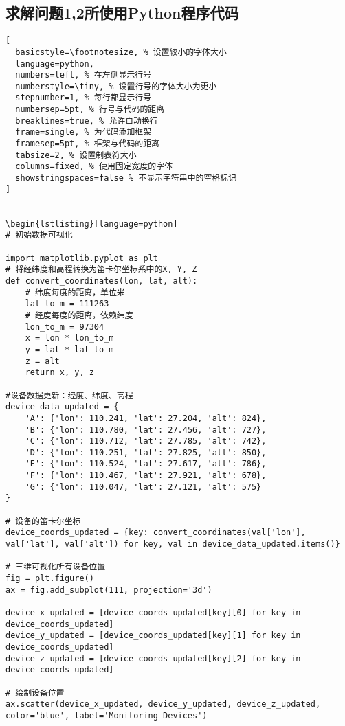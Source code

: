 \documentclass[withoutpreface,bwprint,12pt,a4paper]{cumcmthesis}
\begin{document}
\begin{appendices}

\newpage


\section{求解问题1,2所使用Python程序代码}

\begin{lstlisting}[
  basicstyle=\footnotesize, % 设置较小的字体大小
  language=python,
  numbers=left, % 在左侧显示行号
  numberstyle=\tiny, % 设置行号的字体大小为更小
  stepnumber=1, % 每行都显示行号
  numbersep=5pt, % 行号与代码的距离
  breaklines=true, % 允许自动换行
  frame=single, % 为代码添加框架
  framesep=5pt, % 框架与代码的距离
  tabsize=2, % 设置制表符大小
  columns=fixed, % 使用固定宽度的字体
  showstringspaces=false % 不显示字符串中的空格标记
]


\begin{lstlisting}[language=python]
# 初始数据可视化

import matplotlib.pyplot as plt
# 将经纬度和高程转换为笛卡尔坐标系中的X, Y, Z
def convert_coordinates(lon, lat, alt):
    # 纬度每度的距离，单位米
    lat_to_m = 111263
    # 经度每度的距离，依赖纬度
    lon_to_m = 97304
    x = lon * lon_to_m
    y = lat * lat_to_m
    z = alt
    return x, y, z

#设备数据更新：经度、纬度、高程
device_data_updated = {
    'A': {'lon': 110.241, 'lat': 27.204, 'alt': 824},
    'B': {'lon': 110.780, 'lat': 27.456, 'alt': 727},
    'C': {'lon': 110.712, 'lat': 27.785, 'alt': 742},
    'D': {'lon': 110.251, 'lat': 27.825, 'alt': 850},
    'E': {'lon': 110.524, 'lat': 27.617, 'alt': 786},
    'F': {'lon': 110.467, 'lat': 27.921, 'alt': 678},
    'G': {'lon': 110.047, 'lat': 27.121, 'alt': 575}
}

# 设备的笛卡尔坐标
device_coords_updated = {key: convert_coordinates(val['lon'], val['lat'], val['alt']) for key, val in device_data_updated.items()}

# 三维可视化所有设备位置
fig = plt.figure()
ax = fig.add_subplot(111, projection='3d')

device_x_updated = [device_coords_updated[key][0] for key in device_coords_updated]
device_y_updated = [device_coords_updated[key][1] for key in device_coords_updated]
device_z_updated = [device_coords_updated[key][2] for key in device_coords_updated]

# 绘制设备位置
ax.scatter(device_x_updated, device_y_updated, device_z_updated, color='blue', label='Monitoring Devices')


\end{lstlisting}
\end{appendices}
\end{document}
